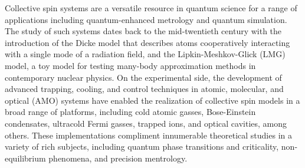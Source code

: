\documentclass[aps,pra,twocolumn,longbibliography]{revtex4-2}
\newcommand{\1}{\mathds{1}}
\begin{document}
Collective spin systems are a versatile resource in quantum science
for a range of applications including quantum-enhanced metrology and
quantum simulation.  The study of such systems dates back to the
mid-twentieth century with the introduction of the Dicke
model\cite{dicke1954coherence} that describes atoms cooperatively
interacting with a single mode of a radiation field, and the
Lipkin-Meshkov-Glick (LMG) model, a toy model for testing many-body
approximation methods in contemporary nuclear
physics\cite{lipkin1965validity, meshkov1965validity,
  glick1965validity}.  On the experimental side, the development of
advanced trapping, cooling, and control techniques in atomic,
molecular, and optical (AMO) systems have enabled the realization of
collective spin models in a broad range of platforms, including cold
atomic gasses\cite{takano2009spin, appel2009mesoscopic}, Bose-Einstein
condensates\cite{klinder2015dynamical, esteve2008squeezing,
  riedel2010atomchipbased, gross2010nonlinear}, ultracold Fermi
gasses\cite{martin2013quantum, bromley2018dynamics,
  smale2019observation}, trapped ions\cite{bohnet2016quantum}, and
optical cavities\cite{schleier-smith2010states, chen2011conditional,
  baumann2010dicke, leroux2010implementation, bohnet2014reduced,
  cox2016deterministic, hosten2016measurement, hosten2016quantum,
  norcia2018cavitymediated, ritsch2013cold}, among others.  These
implementations compliment innumerable theoretical studies in a
variety of rich subjects, including quantum phase transitions and
criticality\cite{latorre2005entanglement, alcalde2007functional,
  wang2012quantum, majd2014lmg}, non-equilibrium
phenomena\cite{walls1978nonequilibrium, morrison2008dynamical,
  morrison2008dissipationdriven, morrison2008collective,
  kessler2012dissipative, bhattacherjee2014nonequilibrium,
  zhiqiang2017nonequilibrium, lang2018concurrence}, and precision
mentrology\cite{wineland1992spin, kitagawa1993squeezed,
  zhong2010simplified, schleier-smith2010squeezing, ma2011quantum,
  huang2015twoaxis, muessel2015twistandturn, huang2015quantum,
  hu2017vacuum, mirkhalaf2018robustifying, lewis-swan2018robust,
  he2019engineering}.
\end{document}
